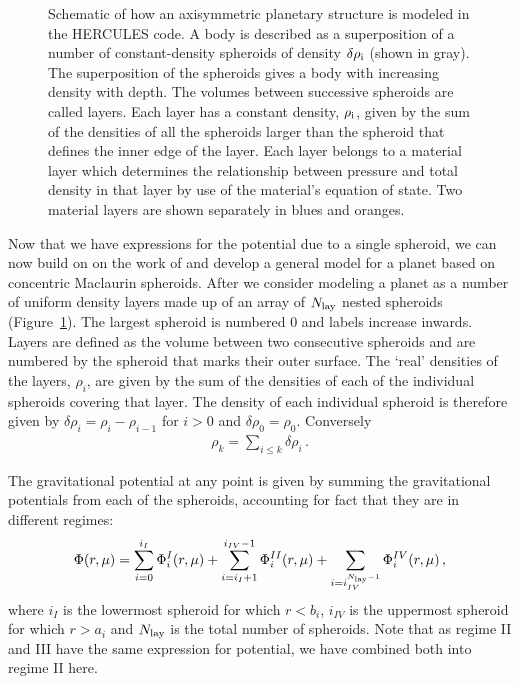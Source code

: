 \documentclass[11pt, oneside]{article}   	%
\begin{document}
\begin{figure}
\caption[]{Schematic of how an axisymmetric planetary structure is modeled in the HERCULES code. A body is described as a superposition of a number of constant-density spheroids of density $\delta\rho_{\rm i}$ (shown in gray). The superposition of the spheroids gives a body with increasing density with depth. The volumes between successive spheroids are called layers. Each layer has a constant density, $\rho_{\rm i}$, given by the sum of the densities of all the spheroids larger than the spheroid that defines the inner edge of the layer. Each layer belongs to a material layer which determines the relationship between pressure and total density in that layer by use of the material's equation of state. Two material layers are shown separately in blues and oranges. }
\label{HUG:fig:concentric_model}
\end{figure}



Now that we have expressions for the potential due to a single spheroid, we can now build on on the work of \cite{Hubbard2013} and develop a general model for a planet based on concentric Maclaurin spheroids.
After \cite{Hubbard2013} we consider modeling a planet as a number of uniform density layers made up of an array of $N_{\rm lay}$ nested spheroids (Figure~\ref{HUG:fig:concentric_model}).
The largest spheroid is numbered 0 and labels increase inwards. Layers are defined as the volume between two consecutive spheroids and are numbered by the spheroid that marks their outer surface.
The `real' densities of the layers, $\rho_i$, are given by the sum of the densities of each of the individual spheroids covering that layer. 
The density of each individual spheroid is therefore given by $\delta \rho_i = \rho_i - \rho_{i-1}$ for $i>0$ and $\delta \rho_0 = \rho_0$.
Conversely
%
\begin{align}
\rho_k=\sum_{i\leq k} \delta\rho_i \, .
\label{HUG:eqn:rho_sum}
\end{align}
%

The gravitational potential at any point is given by summing the gravitational potentials from each of the spheroids, accounting for fact that they are in different regimes:
%
\begin{align}
\Phi (r, \mu) = \sum_{i=0}^{i_{I}} \Phi^{I}_i (r, \mu) + \sum_{i=i_{I}+1}^{i_{IV}-1} \Phi^{II}_i (r, \mu) +  \sum_{i=i_{IV}^{N_{\rm lay}-1}} \Phi^{IV}_i (r, \mu) \, ,
\end{align}
%
where $i_{I}$ is the lowermost spheroid for which $r < b_i $, $i_{IV}$ is the uppermost spheroid for which $r > a_i $ and $N_{\rm lay}$ is the total number of spheroids.
Note that as regime II and III have the same expression for potential, we have combined both into regime II here. 
\end{document}

